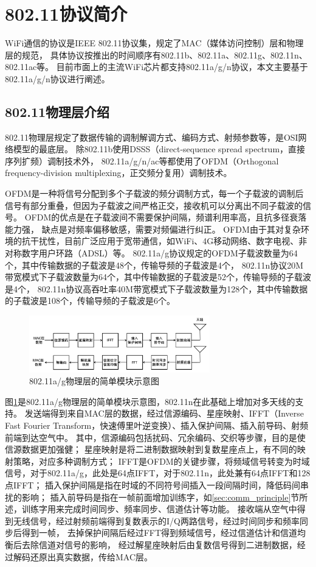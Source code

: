 	\section{802.11协议简介}\label{sec:80211protocol}
	WiFi通信的协议是IEEE 802.11协议集，规定了MAC（媒体访问控制）层和物理层的规范，
	具体协议按推出的时间顺序有802.11b、802.11a、802.11g、802.11n、802.11ac等。
	目前市面上的主流WiFi芯片都支持802.11a/g/n协议，本文主要基于802.11a/g/n协议进行阐述。
		\subsection{802.11物理层介绍}
		802.11物理层规定了数据传输的调制解调方式、编码方式、射频参数等，是OSI网络模型的最底层。
		除802.11b使用DSSS（direct-sequence spread spectrum，直接序列扩频）调制技术外，
		802.11a/g/n/ac等都使用了OFDM（Orthogonal frequency-division multiplexing，正交频分复用）调制技术。

		OFDM是一种将信号分配到多个子载波的频分调制方式，每一个子载波的调制后信号有部分重叠，但因为子载波之间严格正交，接收机可以分离出不同子载波的信号。
		OFDM的优点是在子载波间不需要保护间隔，频谱利用率高，且抗多径衰落能力强，
		缺点是对频率偏移敏感，需要对频偏进行纠正\cite{book06commprin}。
		OFDM由于其对复杂环境的抗干扰性，目前广泛应用于宽带通信，如WiFi、4G移动网络、数字电视、非对称数字用户环路（ADSL）等。
		802.11a/g协议规定的OFDM子载波数量为64个，其中传输数据的子载波是48个，传输导频的子载波是4个，
		802.11n协议20M带宽模式下子载波数量为64个，其中传输数据的子载波是52个，传输导频的子载波是4个，
		802.11n协议高吞吐率40M带宽模式下子载波数量为128个，其中传输数据的子载波是108个，传输导频的子载波是6个\cite{ieee80211}。

		\begin{figure}[H]
			\centering
			\includegraphics[width=0.7\textwidth]{img/80211_phy_module.png}
			\caption{802.11a/g物理层的简单模块示意图}
			\label{fig:80211_phy_module}
		\end{figure}
		图\ref{fig:80211_phy_module}是802.11a/g物理层的简单模块示意图，802.11n在此基础上增加对多天线的支持。
		发送端得到来自MAC层的数据，经过信源编码、星座映射、IFFT（Inverse Fast Fourier Transform，快速傅里叶逆变换）、插入保护间隔、插入前导码、射频前端到达空气中。
		其中，信源编码包括扰码、冗余编码、交织等步骤，目的是使信源数据更加强健；
		星座映射是将二进制数据映射到复数星座点上，有不同的映射策略，对应多种调制方式；
		IFFT是OFDM的关键步骤，将频域信号转变为时域信号，对于802.11a/g，此处是64点IFFT，对于802.11n，此处兼有64点IFFT和128点IFFT；
		插入保护间隔是指在时域的不同符号间插入一段间隔时间，降低码间串扰的影响；
		插入前导码是指在一帧前面增加训练字，如\ref{sec:comm_principle}节所述，训练字用来完成时间同步、频率同步、信道估计等功能。
		接收端从空气中得到无线信号，经过射频前端得到复数表示的I/Q两路信号，经过时间同步和频率同步后得到一帧，
		去掉保护间隔后经过FFT得到频域信号，经过信道估计和信道均衡后去除信道对信号的影响，
		经过解星座映射后由复数信号得到二进制数据，经过解码还原出真实数据，传给MAC层。

